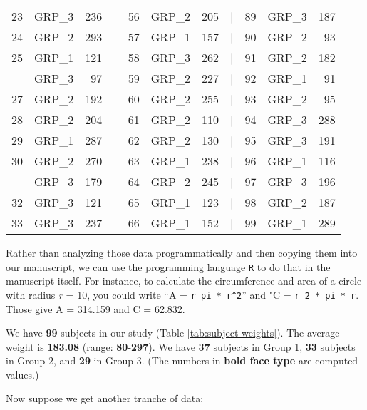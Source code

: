 \documentclass[smallextended]{svjour3}       %
\begin{document}
\begin{table}
\begin{tabular}[t]{rlrlrlrlrlr}
23 & GRP\_3 & 236 & | & 56 & GRP\_2 & 205 & | & 89 & GRP\_3 & 187\\
24 & GRP\_2 & 293 & | & 57 & GRP\_1 & 157 & | & 90 & GRP\_2 & 93\\
25 & GRP\_1 & 121 & | & 58 & GRP\_3 & 262 & | & 91 & GRP\_2 & 182\\
\addlinespace
26 & GRP\_3 & 97 & | & 59 & GRP\_2 & 227 & | & 92 & GRP\_1 & 91\\
27 & GRP\_2 & 192 & | & 60 & GRP\_2 & 255 & | & 93 & GRP\_2 & 95\\
28 & GRP\_2 & 204 & | & 61 & GRP\_2 & 110 & | & 94 & GRP\_3 & 288\\
29 & GRP\_1 & 287 & | & 62 & GRP\_2 & 130 & | & 95 & GRP\_3 & 191\\
30 & GRP\_2 & 270 & | & 63 & GRP\_1 & 238 & | & 96 & GRP\_1 & 116\\
\addlinespace
31 & GRP\_3 & 179 & | & 64 & GRP\_2 & 245 & | & 97 & GRP\_3 & 196\\
32 & GRP\_3 & 121 & | & 65 & GRP\_1 & 123 & | & 98 & GRP\_2 & 187\\
33 & GRP\_3 & 237 & | & 66 & GRP\_1 & 152 & | & 99 & GRP\_1 & 289\\
\bottomrule
\end{tabular}
\end{table}

Rather than analyzing those data programmatically and then copying them into our manuscript, we can use the programming language \texttt{R} to do that in the manuscript itself. For instance, to calculate the circumference and area of a circle with radius \emph{r} = 10, you could write ``A = \texttt{\textasciigrave{}r\ pi\ *\ r\^{}2\textasciigrave{}}'' and "C = \texttt{\textasciigrave{}r\ 2\ *\ pi\ *\ r\textasciigrave{}}. Those give A = 314.159 and C = 62.832.

We have \textbf{99} subjects in our study (Table \ref{tab:subject-weights}). The average weight is \textbf{183.08} (range: \textbf{80}-\textbf{297}). We have \textbf{37} subjects in Group 1, \textbf{33} subjects in Group 2, and \textbf{29} in Group 3. (The numbers in \textbf{bold face type} are computed values.)

Now suppose we get another tranche of data:
\end{document}
